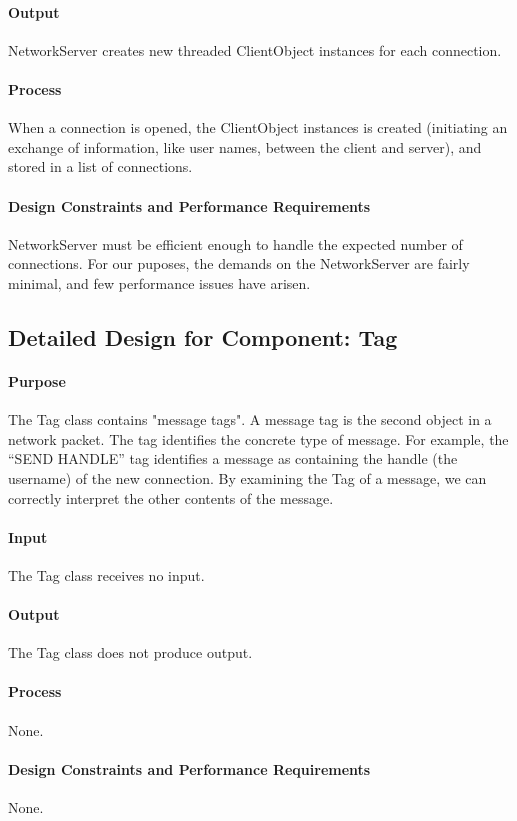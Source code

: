 \documentclass[12pt,a4paper,titlepage]{article}
\begin{document}
\paragraph{Output} NetworkServer creates new threaded ClientObject instances for each connection.
\paragraph{Process} When a connection is opened, the ClientObject instances is created (initiating an exchange of information, like user names, between the client and server), and stored in a list of connections.
\paragraph{Design Constraints and Performance Requirements} NetworkServer must be efficient enough to handle the expected number of connections. For our puposes, the demands on the NetworkServer are fairly minimal, and few performance issues have arisen.

\subsection{Detailed Design for Component: Tag }
\paragraph{Purpose} The Tag class contains "message tags". A message tag is the second object in a network packet. The tag identifies the concrete type of message. For example, the ``SEND HANDLE'' tag identifies a message as containing the handle (the username) of the new connection. By examining the Tag of a message, we can correctly interpret the other contents of the message. 
\paragraph{Input} The Tag class receives no input. 
\paragraph{Output} The Tag class does not produce output. 
\paragraph{Process} None. 
\paragraph{Design Constraints and Performance Requirements} None.
\end{document}
